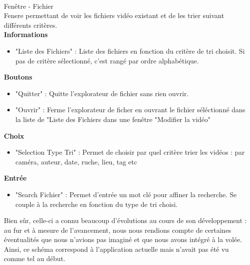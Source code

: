 \documentclass[11pt,french,a4paper]{report}
\begin{document}
\begin{multicols}{2}
\begin{small}
\dotfill \\

\Large Fenêtre - Fichier\normalsize \\
    Fenere permettant de voir les fichiers vidéo existant et de les trier suivant différents critères. \\
\large \textbf{Informations}\normalsize 
    \begin{itemize}[label=, leftmargin=*,parsep=0cm,itemsep=0cm,topsep=0cm]
        \item "Liste des Fichiers" : Liste des fichiers en fonction du critère de tri choisit. Si pas de critère sélectionné,
        c'est rangé par ordre alphabétique.
    \end{itemize}
\large \textbf{Boutons}\normalsize
    \begin{itemize}[label=, leftmargin=*,parsep=0cm,itemsep=0cm,topsep=0cm]
        \item "Quitter" : Quitte l'explorateur de fichier sans rien ouvrir.
        \item "Ouvrir" : Ferme l'explorateur de ficher en ouvrant le fichier séléctionné dans la liste de "Liste des Fichiers dans une
        fenêtre "Modifier la vidéo"
    \end{itemize}
\large \textbf{Choix}\normalsize
    \begin{itemize}[label=, leftmargin=*,parsep=0cm,itemsep=0cm,topsep=0cm]
        \item "Selection Type Tri" : Permet de choisir par quel critère trier les vidéos : par caméra, auteur, date, ruche, lieu, tag etc
    \end{itemize}
\large \textbf{Entrée}\normalsize
    \begin{itemize}[label=, leftmargin=*,parsep=0cm,itemsep=0cm,topsep=0cm]
        \item "Search Fichier" : Permet d'entrée un mot clé pour affiner la recherche. Se couple à la recherche en fonction du type de tri
        choisi.
    \end{itemize}


\columnbreak


        \end{small}
    \end{multicols}

Bien sûr, celle-ci a connu beaucoup d'évolutions au cours de son développement : au fur et à mesure de l'avancement,
nous nous rendions compte de certaines éventualités que nous n'avions pas imaginé et que nous avons intégré à la volée. 
Ainsi, ce schéma correspond à l'application actuelle mais n'avait pas été vu comme tel au début. 
\\
\end{document}
